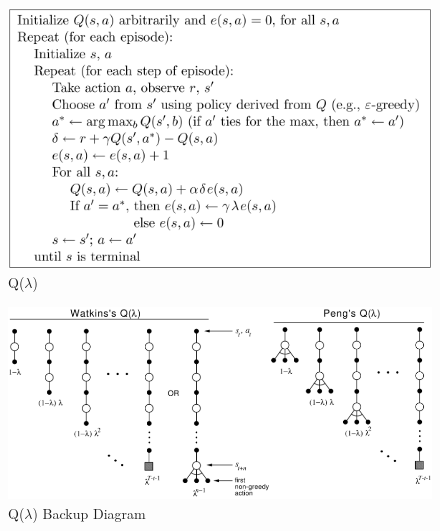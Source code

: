 \documentclass{article}
\begin{document}
\begin{figure}[h]
\includegraphics[scale=0.5]{q_lambda}
\centering
\caption{Q($\lambda$)}
\end{figure}

\newpage
\begin{figure}[h]
\includegraphics[scale=0.5]{q_lambda_diagram}
\centering
\caption{Q($\lambda$) Backup Diagram}
\end{figure}
\end{document}
